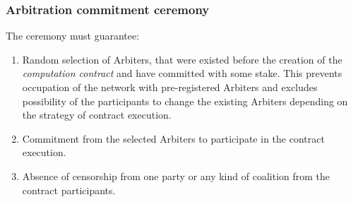 \documentclass[a4paper]{article}
\begin{document}
\subsubsection{Arbitration commitment ceremony}
\label{ceremony}

The ceremony must guarantee:
\begin{enumerate}
    \item Random selection of Arbiters, that were existed before the creation of the \textit{computation contract} and have committed with some stake. This prevents occupation of the network with pre-registered Arbiters and excludes possibility of the participants to change the existing Arbiters depending on the strategy of contract execution.
    \item Commitment from the selected Arbiters to participate in the contract execution.
    \item Absence of censorship from one party or any kind of coalition from the contract participants.
\end{enumerate}
\end{document}

